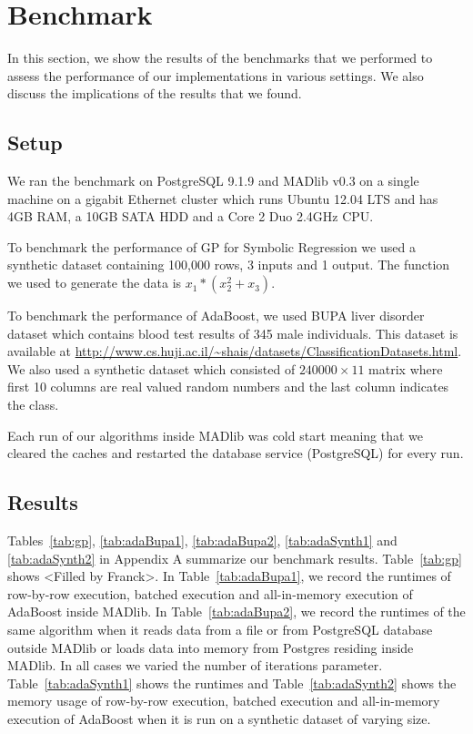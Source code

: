 
\section{Benchmark}
\label{sec:bench}
In this section, we show the results of the benchmarks that we performed to assess the performance of our implementations in various settings. We also discuss the implications of the results that we found.
\subsection{Setup}
We ran the benchmark on PostgreSQL 9.1.9 and MADlib v0.3 on a single machine on a gigabit Ethernet cluster which runs Ubuntu 12.04 LTS and has 4GB RAM, a 10GB SATA HDD and a Core 2 Duo 2.4GHz CPU. 

To benchmark the performance of GP for Symbolic Regression we used a synthetic dataset containing 100,000 rows, 3 inputs and 1 output. The function we used to generate the data is $x_1*(x_2^2+x_3)$.

To benchmark the performance of AdaBoost, we used BUPA liver disorder dataset which contains blood test results of 345 male individuals. This dataset is available at \url{http://www.cs.huji.ac.il/~shais/datasets/ClassificationDatasets.html}. We also used a synthetic dataset which consisted of $240000\times11$ matrix where first 10 columns are real valued random numbers and the last column indicates the class.

Each run of our algorithms inside MADlib was cold start meaning that we cleared the caches and restarted the database service (PostgreSQL) for every run.


\subsection{Results}
Tables~\ref{tab:gp}, \ref{tab:adaBupa1}, \ref{tab:adaBupa2}, \ref{tab:adaSynth1} and \ref{tab:adaSynth2} in Appendix A summarize our benchmark results. Table~\ref{tab:gp} shows <Filled by Franck>. In Table~\ref{tab:adaBupa1}, we record the runtimes of row-by-row execution, batched execution and all-in-memory execution of AdaBoost inside MADlib. In Table~\ref{tab:adaBupa2}, we record the runtimes of the same algorithm when it reads data from a file or from PostgreSQL database outside MADlib or loads data into memory from Postgres residing inside MADlib. In all cases we varied the number of iterations parameter. Table~\ref{tab:adaSynth1} shows the runtimes and Table~\ref{tab:adaSynth2} shows the memory usage of row-by-row execution, batched execution and all-in-memory execution of AdaBoost when it is run on a synthetic dataset of varying size.   

